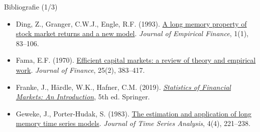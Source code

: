 \begin{frame}{Bibliografie (1/3)}
\begin{itemize}
    \item Ding, Z., Granger, C.W.J., Engle, R.F. (1993). \href{https://doi.org/10.1016/0927-5398(93)90006-D}{A long memory property of stock market returns and a new model}. \textit{Journal of Empirical Finance}, 1(1), 83--106.
    \item Fama, E.F. (1970). \href{https://doi.org/10.2307/2325486}{Efficient capital markets: a review of theory and empirical work}. \textit{Journal of Finance}, 25(2), 383--417.
    \item Franke, J., Härdle, W.K., Hafner, C.M. (2019). \href{https://doi.org/10.1007/978-3-030-13751-9}{\textit{Statistics of Financial Markets: An Introduction}}, 5th ed. Springer.
    \item Geweke, J., Porter-Hudak, S. (1983). \href{https://doi.org/10.1111/j.1467-9892.1983.tb00371.x}{The estimation and application of long memory time series models}. \textit{Journal of Time Series Analysis}, 4(4), 221--238.
\end{itemize}
\end{frame}

